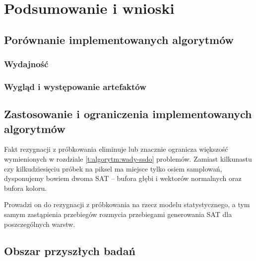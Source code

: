 \chapter{Podsumowanie i wnioski}
\label{t:wnioski}

	\section{Porównanie implementowanych algorytmów}
	\label{t:wnioski:porownanie}
	
		\subsection{Wydajność}
		\label{t:wnioski:porownanie:wydajnosc}
		
		\subsection{Wygląd i występowanie artefaktów}
		\label{t:wnioski:porownanie:wyglad}
		
	
	\section{Zastosowanie i ograniczenia implementowanych algorytmów}
	\label{t:wnioski:zastosowanie}
	
	
	
	Fakt rezygnacji z próbkowania eliminuje lub znacznie ogranicza większość wymienionych w rozdziale \ref{t:algorytm:wady-ssdo} problemów. Zamiast kilkunastu czy kilkudziesięciu próbek na piksel ma miejsce tylko osiem samplowań, dysponujemy bowiem dwoma SAT -- bufora głębi i wektorów normalnych oraz bufora koloru.
	
	Prowadzi on do rezygnacji z próbkowania na rzecz modelu statystycznego, a tym samym zastąpienia przebiegów rozmycia przebiegami generowania SAT dla poszczególnych warstw.
	
	\section{Obszar przyszłych badań}
	\label{t:wnioski:przyszle}
	
